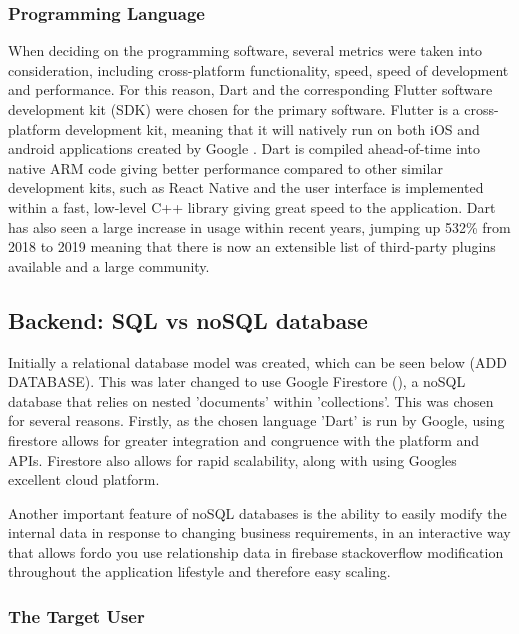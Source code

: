 \documentclass[12pt]{article}
\begin{document}
	\subsubsection{Programming Language}
	When deciding on the programming software, several metrics were taken into consideration, including cross-platform functionality, speed, speed of development and performance. For this reason, Dart and the corresponding Flutter software development kit (SDK) were chosen for the primary software. Flutter is a cross-platform development kit, meaning that it will natively run on both iOS and android applications created by Google \cite{flutter}. Dart is compiled ahead-of-time into native ARM code giving better performance compared to other similar development kits, such as React Native and the user interface  is implemented within a fast, low-level C++ library giving great speed to the application. Dart has also seen a large increase in usage within recent years, jumping up 532\% from 2018 to 2019 \cite{Github, 2018} meaning that there is now an extensible list of third-party plugins available and a large community.
	
	\subsection{Backend: SQL vs noSQL database}
	Initially a relational database model was created, which can be seen below (ADD DATABASE). This was later changed to use Google Firestore (\cite{firestore}), a noSQL database that relies on  nested 'documents' within 'collections'. This was chosen for several reasons. Firstly, as the chosen language 'Dart' is run by Google, using firestore allows for greater integration and congruence with the platform and APIs. Firestore also allows for rapid scalability, along with using Googles excellent cloud platform.
	
	Another important feature of noSQL databases is the ability to easily modify the internal data in response to changing business requirements, in an interactive way that allows fordo you use relationship data in firebase stackoverflow modification throughout the application lifestyle and therefore easy scaling.

	
	
	\subsubsection{The Target User}
	
\end{document}
